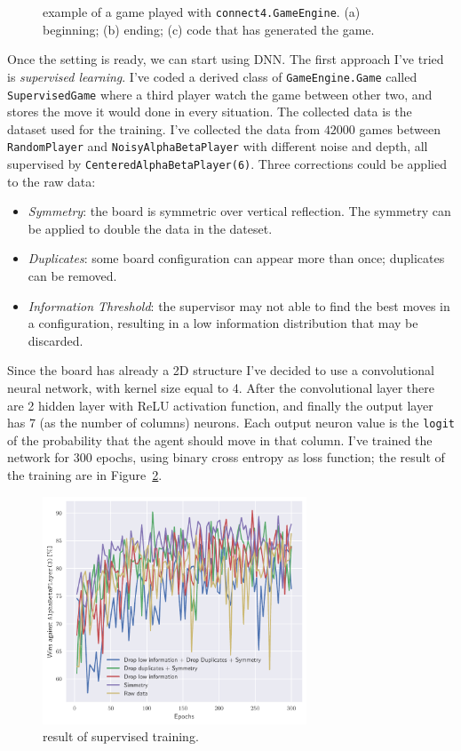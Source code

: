 \documentclass{article}
\newcommand{\ipy}[1]{\texttt{#1}}
\begin{document}
\begin{figure}
    \caption{example of a game played with \ipy{connect4.GameEngine}. (a) beginning; (b) ending; (c) code that has generated the game.}
    \label{fig:screenshot}
  \end{figure}

  Once the setting is ready, we can start using DNN. The first approach I've tried is \emph{supervised learning}. I've coded a
  derived class of \ipy{GameEngine.Game} called \ipy{SupervisedGame} where a third player watch the game between other two, and stores the move it would done in every situation. The collected data is the dataset used for the training. I've collected the data from \(42000\) games between \ipy{RandomPlayer} and \ipy{NoisyAlphaBetaPlayer} with different noise and depth, all supervised by \ipy{CenteredAlphaBetaPlayer(6)}. Three corrections could be applied to the raw data:
  \begin{itemize}
    \item \emph{Symmetry}: the board is symmetric over vertical reflection. The symmetry can be applied to double the data in the dateset.
    \item \emph{Duplicates}: some board configuration can appear more than once; duplicates can be removed.
    \item \emph{Information Threshold}: the supervisor may not able to find the best moves in a configuration, resulting in a low information distribution that may be discarded.
  \end{itemize}
  Since the board has already a 2D structure I've decided to use a convolutional neural network, with kernel size equal to 4. After the convolutional layer there are 2 hidden layer with ReLU activation function, and finally the output layer has 7 (as the number of columns) neurons. Each output neuron value is the \texttt{logit} of the probability that the agent should move in that column.
  I've trained the network for 300 epochs, using binary cross entropy as loss function; the result of the training are in Figure~\ref{fig:supervisedresult}.
  
  \begin{figure}
    \centering
    \includegraphics[width=0.7\textwidth]{img/supervised.pdf}
    
    \caption{result of supervised training.}
    \label{fig:supervisedresult}
  \end{figure}
  
\end{document}
